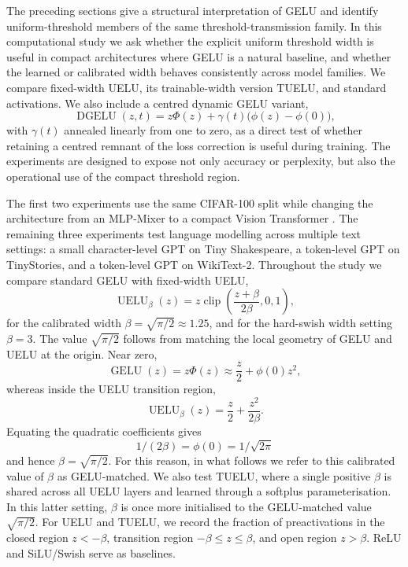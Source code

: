\documentclass[11pt]{article}
\begin{document}
The preceding sections give a structural interpretation of GELU and identify uniform-threshold members of the same threshold-transmission family. In this computational study we ask whether the explicit uniform threshold width is useful in compact architectures where GELU is a natural baseline, and whether the learned or calibrated width behaves consistently across model families. We compare fixed-width UELU, its trainable-width version TUELU, and standard activations. We also include a centred dynamic GELU variant,
$$
\operatorname{DGELU}(z,t)=z\Phi(z)+\gamma(t)\bigl(\phi(z)-\phi(0)\bigr),
$$
with $\gamma(t)$ annealed linearly from one to zero, as a direct test of whether retaining a centred remnant of the loss correction is useful during training. The experiments are designed to expose not only accuracy or perplexity, but also the operational use of the compact threshold region.

The first two experiments use the same CIFAR-100 split while changing the architecture from an MLP-Mixer \cite{NEURIPS2021_cba0a4ee} to a compact Vision Transformer \cite{dosovitskiy2021an}. The remaining three experiments test language modelling across multiple text settings: a small character-level GPT on Tiny Shakespeare, a token-level GPT on TinyStories, and a token-level GPT on WikiText-2. 
Throughout the study we compare standard GELU with fixed-width UELU,
$$
\operatorname{UELU}_{\beta}(z)=z\operatorname{clip}\left(\frac{z+\beta}{2\beta},0,1\right),
$$
for the calibrated width $\beta=\sqrt{\pi/2}\approx1.25$, and for the hard-swish width setting $\beta=3$. The value $\sqrt{\pi/2}$ follows from matching the local geometry of GELU and UELU at the origin. Near zero,
$$
\operatorname{GELU}(z)=z\Phi(z)\approx \frac{z}{2}+\phi(0)z^2,
$$
whereas inside the UELU transition region,
$$
\operatorname{UELU}_{\beta}(z)=\frac{z}{2}+\frac{z^2}{2\beta}.
$$
Equating the quadratic coefficients gives 
$$
1/(2\beta)=\phi(0)=1/\sqrt{2\pi}
$$ 
and hence $\beta=\sqrt{\pi/2}$. For this reason, in what follows we refer to this calibrated value of $\beta$ as GELU-matched. We also test TUELU, where a single positive $\beta$ is shared across all UELU layers and learned through a softplus parameterisation. In this latter setting, $\beta$ is once more initialised to the GELU-matched value $\sqrt{\pi/2}$. For UELU and TUELU, we record the fraction of preactivations in the closed region $z<-\beta$, transition region $-\beta\le z\le\beta$, and open region $z>\beta$. ReLU and SiLU/Swish \cite{Elfwing2018} serve as baselines.
\end{document}
